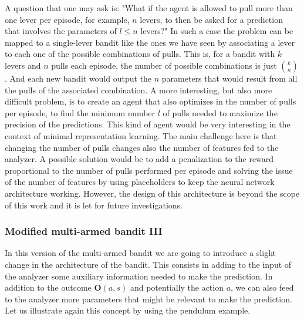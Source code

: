 \documentclass[11pt,a4paper,twoside]{report}
\newcommand{\+}{\textnormal{+} }
\theoremstyle{definition}
\numberwithin{equation}{chapter}
\begin{document}
    A question that one may ask is: "What if the agent is allowed to pull more
    than one lever per episode, for example, $n$ levers, to then be asked for a
    prediction that involves the parameters of $l\leq n$ levers?" In such a case
    the problem can be mapped to a single-lever bandit like the ones we have
    seen by associating a lever to each one of the possible combinations of
    pulls. This is, for a bandit with $k$ levers and $n$ pulls each episode, the
    number of possible combinations is just $k\choose n$.  And each new bandit
    would output the $n$ parameters that would result from all the pulls of the
    associated combination. A more interesting, but also more difficult problem,
    is to create an agent that also optimizes in the number of pulls per
    episode, to find the minimum number $l$ of pulls needed to maximize the
    precision of the predictions. This kind of agent would be very interesting
    in the context of minimal representation learning. The main challenge here
    is that changing the number of pulls changes also the number of features
    fed to the analyzer. A possible solution would be to add a penalization
    to the reward proportional to the number of pulls performed per episode and
    solving the issue of the number of features by using placeholders to keep
    the neural network architecture working. However, the design of this
    architecture is beyond the scope of this work and it is let for future
    investigations.

  \subsubsection{Modified multi-armed bandit III}

  In this version of the multi-armed bandit we are going to introduce a 
  slight change in the architecture of the bandit. This consists in adding
  to the input of the analyzer some auxiliary information needed to make
  the prediction. In addition to the outcome $\textbf{O}(a,s)$ and potentially
  the action $a$, we can also feed to the analyzer more parameters that 
  might be relevant to make the prediction. Let us illustrate again this
  concept by using the pendulum example.
\end{document}
